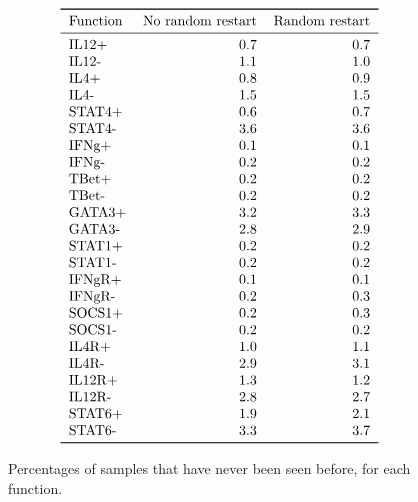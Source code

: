 \documentclass{llncs}
\begin{document}
\begin{figure}[htbp]
	\[
\begin{tabular}{lrr}
\toprule
Function &  No random restart &      Random restart \\
\midrule
IL12+    &   0.7 &   0.7 \\
IL12-    &   1.1 &   1.0 \\
IL4+     &   0.8 &   0.9 \\
IL4-     &   1.5 &   1.5 \\
STAT4+   &   0.6 &   0.7 \\
STAT4-   &   3.6 &   3.6 \\
IFNg+    &   0.1 &   0.1 \\
IFNg-    &   0.2 &   0.2 \\
TBet+    &   0.2 &   0.2 \\
TBet-    &   0.2 &   0.2 \\
GATA3+   &   3.2 &   3.3 \\
GATA3-   &   2.8 &   2.9 \\
STAT1+   &   0.2 &   0.2 \\
STAT1-   &   0.2 &   0.2 \\
IFNgR+   &   0.1 &   0.1 \\
IFNgR-   &   0.2 &   0.3 \\
SOCS1+   &   0.2 &   0.3 \\
SOCS1-   &   0.2 &   0.2 \\
IL4R+    &   1.0 &   1.1 \\
IL4R-    &   2.9 &   3.1 \\
IL12R+   &   1.3 &   1.2 \\
IL12R-   &   2.8 &   2.7 \\
STAT6+   &   1.9 &   2.1 \\
STAT6-   &   3.3 &   3.7 \\
\bottomrule
\end{tabular}
	\]
	\caption{Percentages of samples that have never been seen before, for each function.\label{eff-samp}}
\end{figure}

\begin{listfig}[htb]
	
	\caption{Prior knowledge for the lymphocyte model. For each species, a set of possible influencers is given. The PAC algorithm will then learn a model in which only the specified influencers can either induce or inhibit the species.\label{hints}}
\end{listfig}
\end{document}
